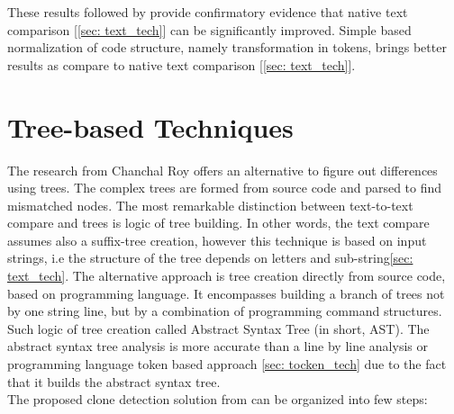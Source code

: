 \documentclass{report}
\begin{document}
These results followed by \cite{tocken_kamiya} provide confirmatory evidence that native text comparison [\ref{sec: text_tech}] can be significantly improved. Simple based normalization of code structure, namely transformation in tokens,  brings better results as compare to native text comparison [\ref{sec: text_tech}]. 


\section{Tree-based Techniques}
\label{sec: tree_tech}
The research from Chanchal Roy \cite{software_clone_detection} offers an alternative to figure out differences using trees. The complex trees are formed from source code and parsed to find mismatched nodes. The most remarkable distinction between text-to-text compare and trees is logic of tree building. In other words, the text compare assumes also a suffix-tree creation, however this technique is based on input strings, i.e the structure of the tree depends on letters and sub-string\ref{sec: text_tech}. The alternative approach is tree creation directly from source code, based on programming language. It encompasses building a branch of trees not by one string line, but by a combination of programming command structures. Such logic of tree creation called Abstract Syntax Tree (in short, AST). The abstract syntax tree analysis is more accurate than a line by line analysis or programming language token based approach \ref{sec: tocken_tech} due to the fact that it builds the abstract syntax tree.\\
The proposed clone detection solution from \cite{flavius} can be organized into few steps:
\end{document}

